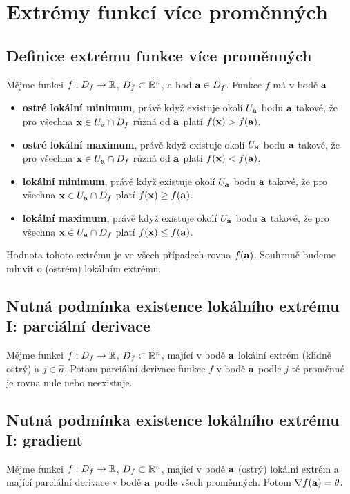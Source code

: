 \section{Extrémy funkcí více proměnných}

\subsection*{Definice extrému funkce více proměnných}

Mějme funkci $f: D_f \to \mathbb{R}$, $D_f \subset \mathbb{R}^n$, a bod $\mathbf{a} \in D_f$. Funkce
$f$ má v bodě $\mathbf{a}$

\begin{itemize}
    \item \textbf{ostré lokální minimum}, právě když existuje okolí $U_{\mathbf{a}}$ bodu $\mathbf{a}$ takové, že pro všechna $\mathbf{x} \in U_{\mathbf{a}} \cap D_f$ různá od $\mathbf{a}$ platí $f(\mathbf{x}) > f(\mathbf{a})$.
    \item \textbf{ostré lokální maximum}, právě když existuje okolí $U_{\mathbf{a}}$ bodu $\mathbf{a}$ takové, že pro všechna $\mathbf{x} \in U_{\mathbf{a}} \cap D_f$ různá od $\mathbf{a}$ platí $f(\mathbf{x}) < f(\mathbf{a})$.
    \item \textbf{lokální minimum}, právě když existuje okolí $U_{\mathbf{a}}$ bodu $\mathbf{a}$ takové, že pro všechna $\mathbf{x} \in U_{\mathbf{a}} \cap D_f$ platí $f(\mathbf{x}) \geq f(\mathbf{a})$.
    \item \textbf{lokální maximum}, právě když existuje okolí $U_{\mathbf{a}}$ bodu $\mathbf{a}$ takové, že pro všechna $\mathbf{x} \in U_{\mathbf{a}} \cap D_f$ platí $f(\mathbf{x}) \leq f(\mathbf{a})$.
\end{itemize}

\noindent Hodnota tohoto extrému je ve všech případech rovna $f(\mathbf{a})$.
Souhrnně budeme mluvit o (ostrém) lokálním extrému.

\subsection*{Nutná podmínka existence lokálního extrému I: parciální derivace}

Mějme funkci $f: D_f \to \mathbb{R}$, $D_f \subset \mathbb{R}^n$, mající v bodě $\mathbf{a}$ lokální
extrém (klidně ostrý) a $j \in \hat n$. Potom parciální derivace funkce $f$ v
bodě $\mathbf{a}$ podle $j$-té proměnné je rovna nule nebo neexistuje.

\subsection*{Nutná podmínka existence lokálního extrému I: gradient}

Mějme funkci $f: D_f \to \mathbb{R}$, $D_f \subset \mathbb{R}^n$, mající v bodě $\mathbf{a}$ (ostrý)
lokální extrém a mající parciální derivace v bodě $\mathbf{a}$ podle všech proměnných.
Potom $\nabla f(\mathbf{a}) = \theta$.

